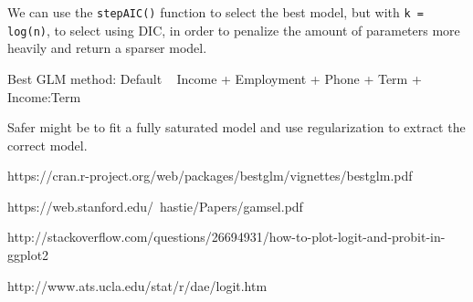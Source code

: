 We can use the \lstinline{stepAIC()} function to select the best model, but with \lstinline{k = log(n)}, to select using DIC, in order to penalize the amount of parameters more heavily and return a sparser model.

Best GLM method:
Default ~ Income + Employment + Phone + Term + Income:Term

Safer might be to fit a fully saturated model and use regularization to extract the correct model. 


https://cran.r-project.org/web/packages/bestglm/vignettes/bestglm.pdf

https://web.stanford.edu/~hastie/Papers/gamsel.pdf

http://stackoverflow.com/questions/26694931/how-to-plot-logit-and-probit-in-ggplot2

http://www.ats.ucla.edu/stat/r/dae/logit.htm

